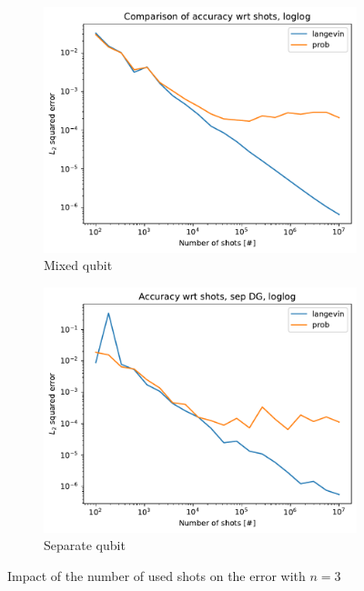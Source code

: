 \documentclass[12pt]{memoir}
\begin{document}
\begin{figure}[H]
    \centering
    \begin{subfigure}[b]{0.49\textwidth}
        \centering
        \includegraphics[width=\textwidth]{figures/experiments/shots/shots_acc_comp_shots_exp_loglog-1.png}
        \caption{Mixed qubit}
        \label{fig:shots-comp-mixed-sub}
    \end{subfigure}
    \hfill
    \begin{subfigure}[b]{0.49\textwidth}
        \centering
        \includegraphics[width=\textwidth]{figures/experiments/shots/shots_acc_comp_shots_exp_sep_loglog-1.png}
        \caption{Separate qubit}
        \label{fig:shots-comp-sep-sub}
    \end{subfigure}
    \caption{Impact of the number of used shots on the error with $n=3$}
    \label{fig:shots-comp}
\end{figure}
\end{document}
